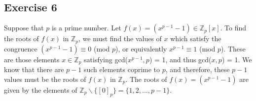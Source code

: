 \subsection*{Exercise 6}
Suppose that $p$ is a prime number. Let $f(x) = (x^{p-1} - 1) \in \mathbb{Z}_p[x]$. To find the roots of $f(x)$ in $\mathbb{Z}_p$, we must find the values of $x$ which satisfy the congruence $(x^{p-1} - 1) \equiv 0$ (mod $p$), or equivalently $x^{p-1} \equiv 1$ (mod $p$). These are those elements $x \in \mathbb{Z}_p$ satisfying gcd($x^{p-1},p$) = 1, and thus gcd($x,p$) = 1. We know that there are $p-1$ such elements coprime to $p$, and therefore, these $p-1$ values must be the roots of $f(x)$ in $\mathbb{Z}_p$. The roots of $f(x) = (x^{p-1} - 1)$ are given by the elements of $\mathbb{Z}_p\backslash\{[0]_p\} = \{1,2,...,p-1\}$.